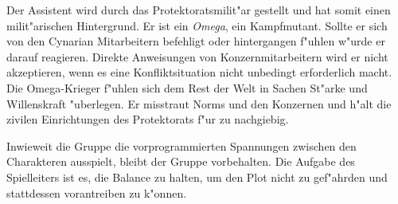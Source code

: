 Der Assistent wird durch das Protektoratsmilit"ar gestellt und hat somit einen milit"arischen Hintergrund. Er ist ein \emph{Omega}, ein Kampfmutant. Sollte er sich von den Cynarian Mitarbeitern befehligt oder hintergangen f"uhlen w"urde er darauf reagieren. Direkte Anweisungen von Konzernmitarbeitern wird er nicht akzeptieren, wenn es eine Konfliktsituation nicht unbedingt erforderlich macht. Die Omega-Krieger f"uhlen sich dem Rest der Welt in Sachen St"arke und Willenskraft "uberlegen. Er misstraut Norms und den Konzernen und h"alt die zivilen Einrichtungen des Protektorats f"ur zu nachgiebig.

Inwieweit die Gruppe die vorprogrammierten Spannungen zwischen den Charakteren ausspielt, bleibt der Gruppe vorbehalten. Die Aufgabe des Spielleiters ist es, die Balance zu halten, um den Plot nicht zu gef"ahrden und stattdessen vorantreiben zu k"onnen. 